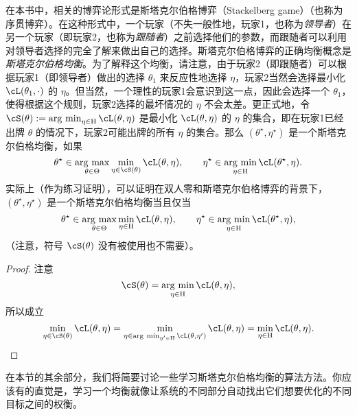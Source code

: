 \documentclass[../../book-main.tex]{subfiles}
\begin{document}
在本书中，相关的博弈论形式是斯塔克尔伯格博弈（Stackelberg game）（也称为序贯博弈）。在这种形式中，一个玩家（不失一般性地，玩家1，也称为\textit{领导者}）在另一个玩家（即玩家2，也称为\textit{跟随者}）之前选择他们的参数，而跟随者可以利用对领导者选择的完全了解来做出自己的选择。斯塔克尔伯格博弈的正确均衡概念是\textit{斯塔克尔伯格均衡}。为了解释这个均衡，请注意，由于玩家2（即跟随者）可以根据玩家1（即领导者）做出的选择 \(\theta_{1}\) 来反应性地选择 \(\eta\)，玩家2当然会选择最小化 \(\cL(\theta_{1}, \cdot)\) 的 \(\eta\)。但当然，一个理性的玩家1会意识到这一点，因此会选择一个 \(\theta_{1}\)，使得根据这个规则，玩家2选择的最坏情况的 \(\eta\) 不会太差。更正式地，令 \(\cS(\theta) := \argmin_{\eta \in \Eta}\cL(\theta, \eta)\) 是最小化 \(\cL(\theta, \eta)\) 的 \(\eta\) 的集合，即在玩家1已经出牌 \(\theta\) 的情况下，玩家2可能出牌的所有 \(\eta\) 的集合。那么 \((\theta^{\star}, \eta^{\star})\) 是一个斯塔克尔伯格均衡，如果
\begin{equation}
    \theta^{\star} \in \argmax_{\theta \in \Theta}\min_{\eta \in \cS(\theta)}\cL(\theta, \eta), \qquad \eta^{\star} \in \argmin_{\eta  \in \Eta}\cL(\theta^{\star}, \eta).
\end{equation}
实际上（作为练习证明），可以证明在双人零和斯塔克尔伯格博弈的背景下，\((\theta^{\star}, \eta^{\star})\) 是一个斯塔克尔伯格均衡当且仅当
\begin{equation}
    \theta^{\star} \in \argmax_{\theta \in \Theta}\min_{\eta \in \Eta}\cL(\theta, \eta), \qquad \eta^{\star} \in \argmin_{\eta  \in \Eta}\cL(\theta^{\star}, \eta),
\end{equation}
（注意，符号 \(\cS(\theta)\) 没有被使用也不需要）。
\begin{proof} 
    注意
    \begin{equation}
        \cS(\theta) = \argmin_{\eta \in \Eta}\cL(\theta, \eta),
    \end{equation}
    所以成立
    \begin{equation}
        \min_{\eta \in \cS(\theta)}\cL(\theta, \eta) = \min_{\eta \in \argmin_{\eta^{\prime} \in \Eta}\cL(\theta, \eta^{\prime})}\cL(\theta, \eta) = \min_{\eta \in \Eta}\cL(\theta, \eta).
    \end{equation}
\end{proof}

在本节的其余部分，我们将简要讨论一些学习斯塔克尔伯格均衡的算法方法。你应该有的直觉是，学习一个均衡就像让系统的不同部分自动找出它们想要优化的不同目标之间的权衡。
\end{document}
